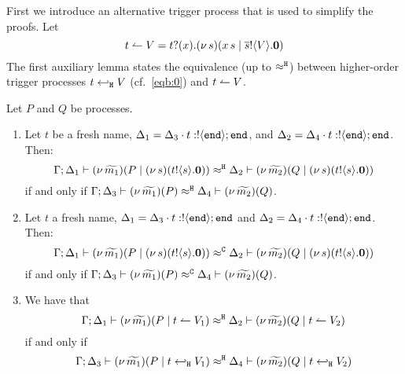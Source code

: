 First we introduce an alternative trigger process
that is used to simplify the proofs. Let
\begin{equation}
	t \leftharpoonup V = t ? (x) . (\nu\, s)(x\, {s} \;|\; \overline{s} ! \langle V \rangle . \mathbf{0})
	\label{eq:ntrig}
\end{equation}
\noindent
The first auxiliary lemma states the equivalence (up to $\approx^\mathtt{H}$) between
higher-order trigger processes $t \hookleftarrow_{\mathtt{H}} V$ (cf.~\eqref{eqb:0}) and $t \leftharpoonup V$.
\begin{lemma}
Let $P$ and $Q$ be processes.
	\label{lem:alt_tr}
	\begin{enumerate}
		\item	Let $t$ be a fresh name, $\Delta_1 = \Delta_3 \cdot t: ! \langle \mathtt{end} \rangle ; \mathtt{end}$, and
				$\Delta_2 = \Delta_4 \cdot t: ! \langle \mathtt{end} \rangle ; \mathtt{end}$. Then:
				\[
					\Gamma; \Delta_1 \vdash (\nu\, \widetilde{m_1})(P \;|\; (\nu\, s)(t ! \langle s \rangle . \mathbf{0})  )  \approx^\mathtt{H} \Delta_2 \vdash (\nu\, \widetilde{m_2})(Q \;|\; (\nu\, s)(t ! \langle s \rangle . \mathbf{0})  )
				\]
				if and only if
				$
					\Gamma; \Delta_3 \vdash (\nu\, \widetilde{m_1})(P  )  \approx^\mathtt{H} \Delta_4 \vdash (\nu\, \widetilde{m_2})(Q)
				$.

		\item	Let $t$ a fresh name, $\Delta_1 = \Delta_3 \cdot t: ! \langle \mathtt{end} \rangle ; \mathtt{end}$ and
				$\Delta_2 = \Delta_4 \cdot t: ! \langle \mathtt{end} \rangle ; \mathtt{end}$. Then:
				\[
					\Gamma; \Delta_1 \vdash (\nu\, \widetilde{m_1})(P \;|\; (\nu\, s)(t ! \langle s \rangle . \mathbf{0})  )  \approx^\mathtt{C} \Delta_2 \vdash (\nu\, \widetilde{m_2})(Q \;|\; (\nu\, s)(t ! \langle s \rangle . \mathbf{0})  )
				\]
				if and only if
				$
					\Gamma; \Delta_3 \vdash (\nu\, \widetilde{m_1})(P  )  \approx^\mathtt{C} \Delta_4 \vdash (\nu\, \widetilde{m_2})(Q)
				$.

		\item We have that
				\[
					\Gamma; \Delta_1 \vdash (\nu\, \widetilde{m_1})(P \;|\; t \leftharpoonup V_1  )  \approx^\mathtt{H} \Delta_2 \vdash (\nu\, \widetilde{m_2})(Q \;|\; t \leftharpoonup V_2  )
				\]
				if and only if
				\[
					\Gamma; \Delta_3 \vdash (\nu\, \widetilde{m_1})(P \;|\; t \hookleftarrow_{\mathtt{H}} V_1  )  \approx^\mathtt{H} \Delta_4 \vdash (\nu\, \widetilde{m_2})(Q \;|\; t \hookleftarrow_{\mathtt{H}} V_2)
				\]
	\end{enumerate}
\end{lemma}

